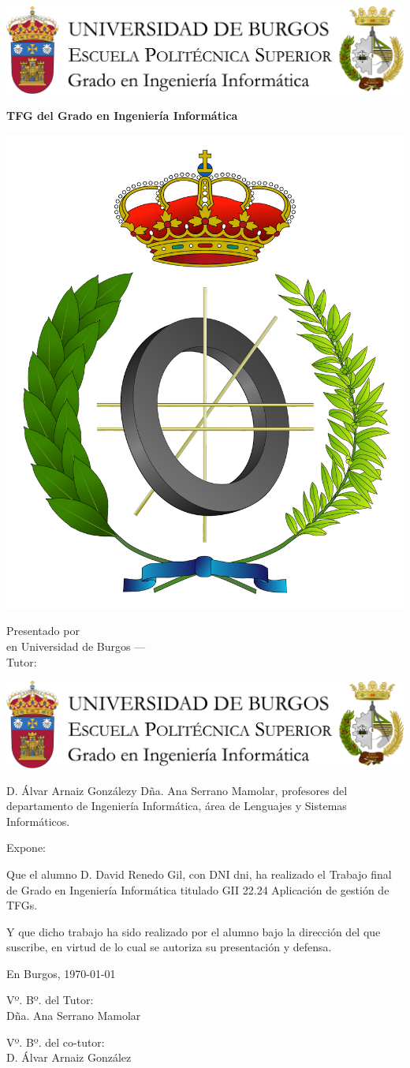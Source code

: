 \documentclass[a4paper,12pt,twoside]{memoir}
\title{\nombreTFG}
\author{\nombre}
\date{\today}
\makeatletter
\def\maketitle{
		\null
		\thispagestyle{empty}
		\noindent\includegraphics[width=\textwidth]{cabecera}\vspace{1cm}%
		\vfill
		\colorbox{cpardoBox}{%
			\begin{minipage}{.8\textwidth}
				\vspace{.5cm}\Large
				\begin{center}
					\textbf{TFG del Grado en Ingeniería Informática}\vspace{.6cm}\\
					\textbf{\LARGE\@title{}}
				\end{center}
				\vspace{.2cm}
			\end{minipage}
			
		}%
		\hfill\begin{minipage}{.20\textwidth}
			\includegraphics[width=\textwidth]{escudoInfor}
		\end{minipage}
		\vfill
		\begin{center}%
			{%
				\noindent\LARGE
				Presentado por \@author{}\\ 
				en Universidad de Burgos --- \@date{}\\
				Tutor: \@tutor{}\\
			}%
		\end{center}%
		\null
		\cleardoublepage
	}
\newcommand{\nombre}{David Renedo Gil} %
\makeatother
\begin{document}
		
		\maketitle
		
		
		\newpage\null\thispagestyle{empty}\newpage
		
		
		\thispagestyle{empty}
		
		
		\noindent\includegraphics[width=\textwidth]{cabecera}\vspace{1cm}
		
		\noindent D. Álvar Arnaiz  Gonzálezy Dña. Ana Serrano Mamolar, profesores del departamento de Ingeniería Informática, área de Lenguajes y Sistemas Informáticos.
		
		\noindent Expone:
		
		\noindent Que el alumno D. \nombre, con DNI dni, ha realizado el Trabajo final de Grado en Ingeniería Informática titulado GII 22.24 Aplicación de gestión de TFGs.
		
		\noindent Y que dicho trabajo ha sido realizado por el alumno bajo la dirección del que suscribe, en virtud de lo cual se autoriza su presentación y defensa.
		
		\begin{center} %
			En Burgos, {\large \today}
		\end{center}
		
		\vfill\vfill\vfill
		
		\begin{minipage}{0.45\textwidth}
			\begin{flushleft} %
				Vº. Bº. del Tutor:\\[2cm]
				Dña. Ana Serrano Mamolar
			\end{flushleft}
		\end{minipage}
		\hfill
		\begin{minipage}{0.45\textwidth}
			\begin{flushleft} %
				Vº. Bº. del co-tutor:\\[2cm]
				D. Álvar Arnaiz González
			\end{flushleft}
		\end{minipage}
		\hfill
		
\end{document}
